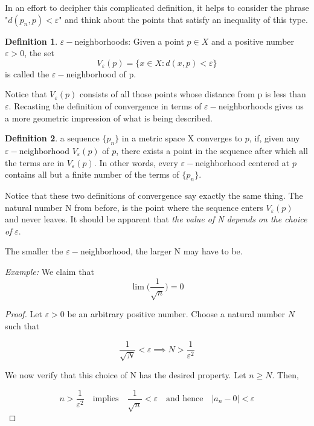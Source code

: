 \documentclass{tufte-book}
\theoremstyle{definition}
\newtheorem{definition}{Definition}[chapter]
\numberwithin{section}{chapter}
\begin{document}
\bigskip
In an effort to decipher this complicated definition, it helps to consider the phrase "$d(p_n, p) < \varepsilon$" and think about the points that satisfy an inequality of this type.


\begin{definition}$\varepsilon-$neighborhoods:  Given a point $p \in X$ and a positive number $\varepsilon > 0$,  the set
\[V_{\varepsilon}(p) = \{x \in X: d(x,p)< \varepsilon\}\]
is called the $\varepsilon-$neighborhood of p. \end{definition}

Notice that $V_{\varepsilon}(p)$ consists of all those points whose distance from p is less than $\varepsilon$.  Recasting the definition of convergence in terms of $\varepsilon-$neighborhoods gives us a more geometric impression of what is being described.

\begin{definition}  a sequence $\{p_n\}$ in a metric space X converges to $p$, if, given any $\varepsilon-$neighborhood  $V_{\varepsilon}(p)$ of $p$, there exists a point in the sequence after which all the terms are in $V_{\varepsilon}(p)$.  In other words, every $\varepsilon-$neighborhood centered at $p$ contains all but a finite number of the terms of $\{p_n\}$.
\end{definition}

Notice that these two definitions of convergence say exactly the same thing.  The natural number N from before, is the point where the sequence enters $V_{\varepsilon}(p)$ and never leaves.  It should be apparent that \emph{the value of N depends on the choice of} $\varepsilon$.   

The smaller the $\varepsilon-$neighborhood, the larger N may have to be.


\noindent \emph{Example:}  We claim that $$ \lim \bigg( \frac{1}{\sqrt{n}} \bigg) = 0 $$

\begin{proof}
Let $\varepsilon >0$ be an arbitrary positive number.  Choose a natural number $N$ such that 

$$	\frac{1}{\sqrt{N}} < \varepsilon \implies N > \frac{1}{{\varepsilon}^2}	$$

We now verify that this choice of N has the desired property.  Let $n \geq N$.  Then,

$$	n> \frac{1}{\varepsilon^2}	  \quad \text{implies} \quad \frac{1}{\sqrt{n}} < \varepsilon \quad \text{and hence} \quad |a_{n} -0|< \varepsilon$$

\end{proof}
\end{document}
